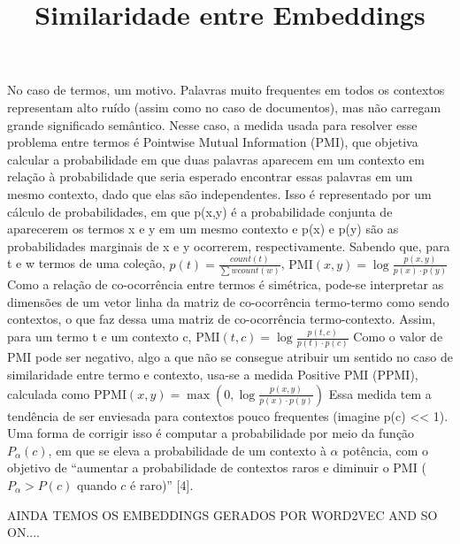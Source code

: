 No caso de termos, um motivo.
Palavras muito frequentes em todos os contextos representam alto ruído (assim como no caso de documentos), mas não carregam
grande significado semântico.
Nesse caso, a medida usada para resolver esse problema entre termos é Pointwise Mutual Information (PMI), que objetiva
calcular a probabilidade em que duas palavras aparecem em um contexto em relação à probabilidade que seria esperado encontrar essas palavras em um
mesmo contexto, dado que elas são independentes.
Isso é representado por um cálculo de probabilidades, em que p(x,y) é a probabilidade conjunta de aparecerem os termos x e y
em um mesmo contexto e p(x) e p(y) são as probabilidades marginais de x e y ocorrerem, respectivamente.
Sabendo que, para t e w termos de uma coleção, $p(t) = \frac{count(t)}{\sum{w}count(w)}$,
$\text{PMI}(x, y) = \log \frac{p(x, y)}{p(x) \cdot p(y)}$
Como a relação de co-ocorrência entre termos é simétrica, pode-se interpretar as dimensões de um vetor linha da matriz de co-ocorrência
termo-termo como sendo contextos, o que faz dessa uma matriz de co-ocorrência termo-contexto.
Assim, para um termo t e um contexto c,
$\text{PMI}(t,c) = \log \frac{p(t,c)}{p(t) \cdot p(c)}$
Como o valor de PMI pode ser negativo, algo a que não se consegue atribuir um sentido no caso de similaridade entre termo
e contexto, usa-se a medida Positive PMI (PPMI), calculada como
$\text{PPMI}(x, y) = \max \left(0, \log \frac{p(x, y)}{p(x) \cdot p(y)}\right)$
Essa medida tem a tendência de ser enviesada para contextos pouco frequentes (imagine p(c) << 1).
Uma forma de corrigir isso é computar a probabilidade por meio da função $P_{\alpha}(c)$, em que se eleva a probabilidade
de um contexto à $\alpha$ potência, com o objetivo de
``aumentar a probabilidade de contextos raros e diminuir o PMI ($P_{\alpha} > P(c)$ quando $c$ é raro)'' [4].



AINDA TEMOS OS EMBEDDINGS GERADOS POR WORD2VEC AND SO ON....


\title{Similaridade entre Embeddings}

